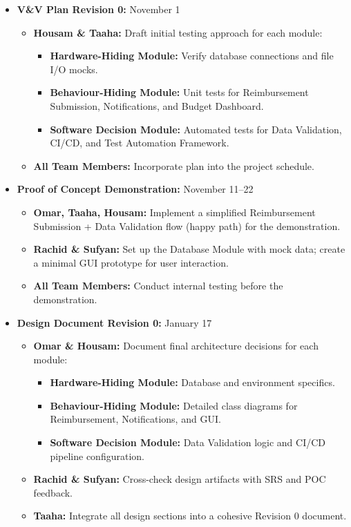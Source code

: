 \documentclass[12pt, titlepage]{article}
\begin{document}
\begin{itemize}
  \item \textbf{V\&V Plan Revision 0:} November 1 
  \begin{itemize}
    \item \textbf{Housam \& Taaha:} Draft initial testing approach for each module:
    \begin{itemize}
      \item \textbf{Hardware-Hiding Module:} Verify database connections and file I/O mocks.
      \item \textbf{Behaviour-Hiding Module:} Unit tests for Reimbursement Submission, Notifications, and Budget Dashboard.
      \item \textbf{Software Decision Module:} Automated tests for Data Validation, CI/CD, and Test Automation Framework.
    \end{itemize}
    \item \textbf{All Team Members:} Incorporate plan into the project schedule.
  \end{itemize}
  
  \item \textbf{Proof of Concept Demonstration:} November 11--22 
  \begin{itemize}
    \item \textbf{Omar, Taaha, Housam:} Implement a simplified Reimbursement Submission + Data Validation flow (happy path) for the demonstration.
    \item \textbf{Rachid \& Sufyan:} Set up the Database Module with mock data; create a minimal GUI prototype for user interaction.
    \item \textbf{All Team Members:} Conduct internal testing before the demonstration.
  \end{itemize}
  
  \item \textbf{Design Document Revision 0:} January 17
  \begin{itemize}
    \item \textbf{Omar \& Housam:} Document final architecture decisions for each module:
    \begin{itemize}
      \item \textbf{Hardware-Hiding Module:} Database and environment specifics.
      \item \textbf{Behaviour-Hiding Module:} Detailed class diagrams for Reimbursement, Notifications, and GUI.
      \item \textbf{Software Decision Module:} Data Validation logic and CI/CD pipeline configuration.
    \end{itemize}
    \item \textbf{Rachid \& Sufyan:} Cross-check design artifacts with SRS and POC feedback.
    \item \textbf{Taaha:} Integrate all design sections into a cohesive Revision 0 document.
  \end{itemize}
  

\end{itemize}
\end{document}
